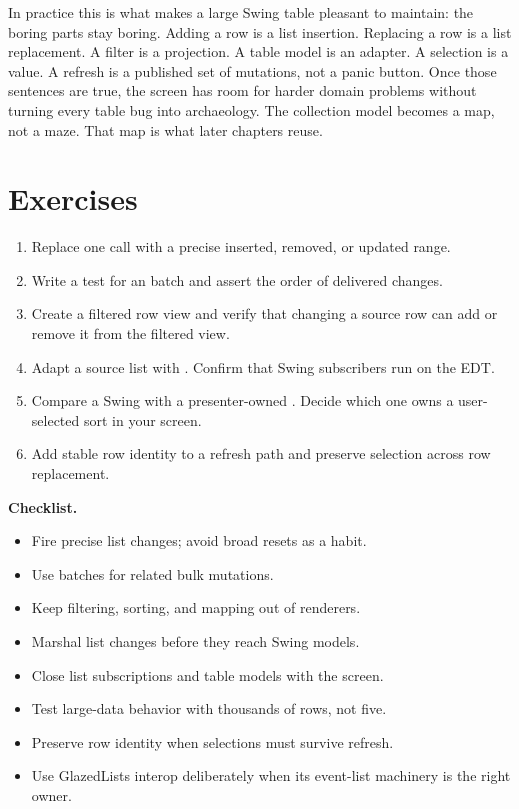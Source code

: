 In practice this is what makes a large Swing table pleasant to maintain: the
boring parts stay boring. Adding a row is a list insertion. Replacing a row is a
list replacement. A filter is a projection. A table model is an adapter. A
selection is a value. A refresh is a published set of mutations, not a panic
button. Once those sentences are true, the screen has room for harder domain
problems without turning every table bug into archaeology.
The collection model becomes a map, not a maze. That map is what later chapters
reuse.

\section{Exercises}

\begin{exercisebox}
\begin{enumerate}
\item Replace one  call with a precise inserted,
removed, or updated range.
\item Write a test for an  batch and assert the order
of delivered changes.
\item Create a filtered row view and verify that changing a source row can add
or remove it from the filtered view.
\item Adapt a source list with . Confirm that Swing
subscribers run on the EDT.
\item Compare a Swing  with a presenter-owned
. Decide which one owns a user-selected sort in your screen.
\item Add stable row identity to a refresh path and preserve selection across
row replacement.
\end{enumerate}
\end{exercisebox}

\textbf{Checklist.}

\begin{itemize}
\item Fire precise list changes; avoid broad resets as a habit.
\item Use batches for related bulk mutations.
\item Keep filtering, sorting, and mapping out of renderers.
\item Marshal list changes before they reach Swing models.
\item Close list subscriptions and table models with the screen.
\item Test large-data behavior with thousands of rows, not five.
\item Preserve row identity when selections must survive refresh.
\item Use GlazedLists interop deliberately when its event-list machinery is the
right owner.
\end{itemize}
